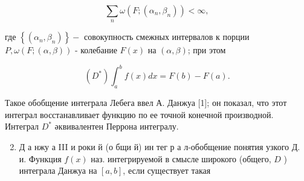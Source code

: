 \documentclass[10pt]{article}
\begin{document}
\[

\sum_{n} \omega\left(F ;\left(\alpha_{n}, \beta_{n}\right)\right)<\infty,

\]



где $\left\{\left(\alpha_{n}, \beta_{n}\right)\right\}-$ совокупность смежных интервалов к порции $P, \omega(F ;(\alpha, \beta))$ - колебание $F(x)$ на $(\alpha, \beta)$; при этом



\[

\left(D^{*}\right) \int_{a}^{b} f(x) d x=F(b)-F(a) .

\]



Такое обобщение интеграла Лебега ввел А. Данжуа [1]; он показал, что этот интеграл восстанавливает функцию по ее точной конечной производной. Интеграл $D^{*}$ әквивалентен Перрона интегралу.



\begin{enumerate}

  \setcounter{enumi}{1}

  \item Д а нжу а III и роки й (о бщи й) ин тег р а л-обобщение понятия узкого Д. и. Функция $f(x)$ наз. интегрируемой в смысле широкого (общего, $D$ ) интеграла Данжуа на $[a, b]$, если существует такая

\end{enumerate}
\end{document}
